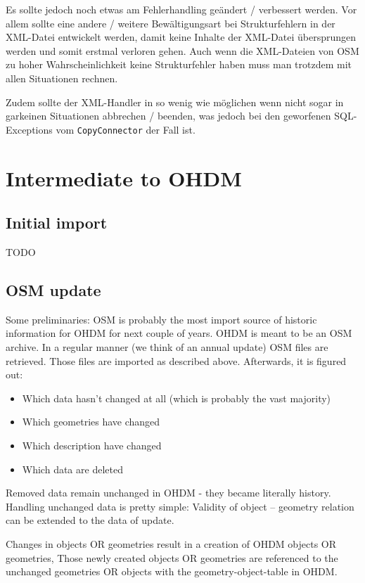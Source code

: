 Es sollte jedoch noch etwas am Fehlerhandling geändert / verbessert werden. Vor allem sollte eine andere / weitere Bewältigungsart bei Strukturfehlern in der XML-Datei entwickelt werden, damit keine Inhalte der XML-Datei übersprungen werden und somit erstmal verloren gehen. Auch wenn die XML-Dateien von OSM zu hoher Wahrscheinlichkeit keine Strukturfehler haben muss man trotzdem mit allen Situationen rechnen.

Zudem sollte der XML-Handler in so wenig wie möglichen wenn nicht sogar in garkeinen Situationen abbrechen / beenden, was jedoch bei den geworfenen SQL-Exceptions vom {\tt CopyConnector} der Fall ist.

\section{Intermediate to OHDM}
\subsection{Initial import}
TODO
\subsection{OSM update}

Some preliminaries: OSM is probably the most import source of historic information for OHDM for
next couple of years. OHDM is meant to be an OSM archive. In a regular manner (we think of an annual
update) OSM files are retrieved. Those files are imported as described above. Afterwards, it is
figured out:

\begin{itemize}
\item Which data hasn't changed at all (which is probably the vast majority)
\item Which geometries have changed
\item Which description have changed
\item Which data are deleted
\end{itemize}

Removed data remain unchanged in OHDM - they became literally history. Handling unchanged data is
pretty simple: Validity of object -- geometry relation can be extended to the data of update.

Changes in objects OR geometries result in a creation of OHDM objects OR geometries, Those
newly created objects OR geometries are referenced to the unchanged geometries OR objects
with the geometry-object-table in OHDM.

